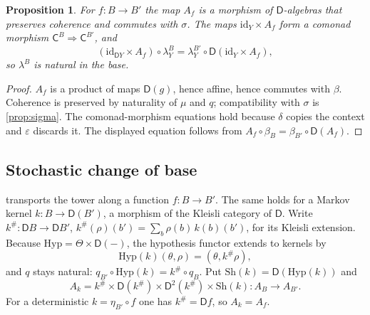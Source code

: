 \documentclass[11pt]{article}
\newtheorem{proposition}[theorem]{Proposition}
\theoremstyle{definition}
\theoremstyle{remark}
\newcommand{\D}{\mathsf{D}}
\newcommand{\Hyp}{\mathrm{Hyp}}
\newcommand{\Sh}{\mathrm{Sh}}
\newcommand{\C}{\mathsf{C}}
\newcommand{\id}{\mathrm{id}}
\begin{document}
\begin{proposition}\label{prop:basechange}
For $f\colon B\to B'$ the map $A_f$ is a morphism of $\D$-algebras that preserves coherence and
commutes with $\sigma$. The maps $\id_Y\times A_f$ form a comonad morphism $\C^B\Rightarrow\C^{B'}$, and
\[
(\id_{\D Y}\times A_f)\circ\lambda^B_Y=\lambda^{B'}_Y\circ\D(\id_Y\times A_f),
\]
so $\lambda^B$ is natural in the base.
\end{proposition}
\begin{proof}
$A_f$ is a product of maps $\D(g)$, hence affine, hence commutes with $\beta$. Coherence is preserved
by naturality of $\mu$ and $q$; compatibility with $\sigma$ is \cref{prop:sigma}. The comonad-morphism
equations hold because $\delta$ copies the context and $\varepsilon$ discards it. The displayed
equation follows from $A_f\circ\beta_B=\beta_{B'}\circ\D(A_f)$.
\end{proof}


\subsection{Stochastic change of base}\label{sec:stoch-base}

 transports the tower along a function $f\colon B\to B'$. The same holds for a
Markov kernel $k\colon B\to\D(B')$, a morphism of the Kleisli category of $\D$. Write
$k^\#\colon\D B\to\D B'$, $k^\#(\rho)(b')=\sum_b\rho(b)\,k(b)(b')$, for its Kleisli extension. Because
$\Hyp=\Theta\times\D(-)$, the hypothesis functor extends to kernels by
\[
\Hyp(k)(\theta,\rho)=(\theta,k^\#\rho),
\]
and $q$ stays natural: $q_{B'}\circ\Hyp(k)=k^\#\circ q_B$. Put $\Sh(k)=\D(\Hyp(k))$ and
\[
A_k=k^\#\times\D(k^\#)\times\D^2(k^\#)\times\Sh(k)\colon A_B\to A_{B'} .
\]
For a deterministic $k=\eta_{B'}\circ f$ one has $k^\#=\D f$, so $A_k=A_f$.
\end{document}
